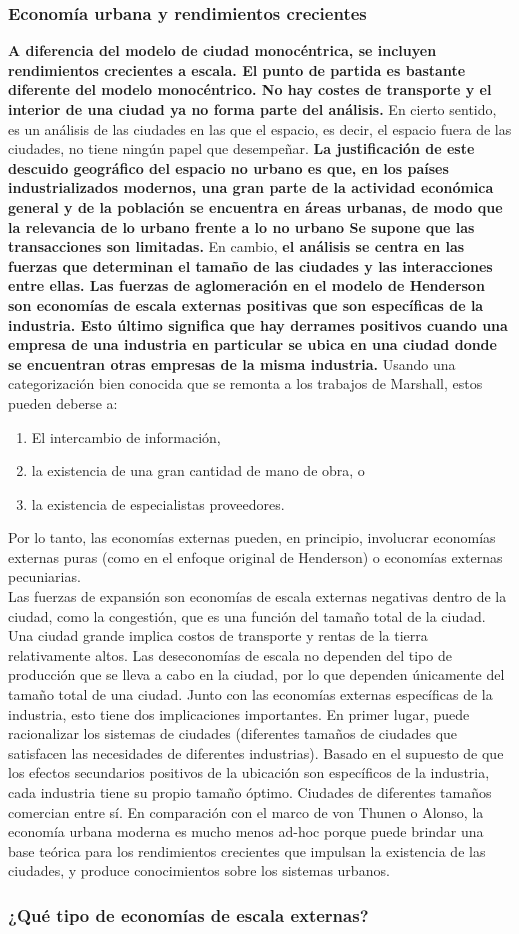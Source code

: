 \subsubsection{Economía urbana y rendimientos crecientes}
\textbf{A diferencia del modelo de ciudad monocéntrica, se incluyen rendimientos crecientes a escala. El punto de partida es bastante diferente del modelo monocéntrico. No hay costes de transporte y el interior de una ciudad ya no forma parte del análisis.} En cierto sentido, es un análisis de las ciudades en las que el espacio, es decir, el espacio fuera de las ciudades, no tiene ningún papel que desempeñar. \textbf{La justificación de este descuido geográfico del espacio no urbano es que, en los países industrializados modernos, una gran parte de la actividad económica general y de la población se encuentra en áreas urbanas, de modo que la relevancia de lo urbano frente a lo no urbano Se supone que las transacciones son limitadas.} En cambio, \textbf{el análisis se centra en las fuerzas que determinan el tamaño de las ciudades y las interacciones entre ellas. Las fuerzas de aglomeración en el modelo de Henderson son economías de escala externas positivas que son específicas de la industria. Esto último significa que hay derrames positivos cuando una empresa de una industria en particular se ubica en una ciudad donde se encuentran otras empresas de la misma industria.} Usando una categorización bien conocida que se remonta a los trabajos de Marshall, estos pueden deberse a:
\begin{enumerate}[\bfseries (i)]
    \item El intercambio de información, 
    \item la existencia de una gran cantidad de mano de obra, o
    \item la existencia de especialistas proveedores.
\end{enumerate}
Por lo tanto, las economías externas pueden, en principio, involucrar economías externas puras (como en el enfoque original de Henderson) o economías externas pecuniarias. \\
Las fuerzas de expansión son economías de escala externas negativas dentro de la ciudad, como la congestión, que es una función del tamaño total de la ciudad. Una ciudad grande implica costos de transporte y rentas de la tierra relativamente altos. Las deseconomías de escala no dependen del tipo de producción que se lleva a cabo en la ciudad, por lo que dependen únicamente del tamaño total de una ciudad. Junto con las economías externas específicas de la industria, esto tiene dos implicaciones importantes. En primer lugar, puede racionalizar los sistemas de ciudades (diferentes tamaños de ciudades que satisfacen las necesidades de diferentes industrias). Basado en el supuesto de que los efectos secundarios positivos de la ubicación son específicos de la industria, cada industria tiene su propio tamaño óptimo. Ciudades de diferentes tamaños comercian entre sí. En comparación con el marco de von Thunen o Alonso, la economía urbana moderna es mucho menos ad-hoc porque puede brindar una base teórica para los rendimientos crecientes que impulsan la existencia de las ciudades, y produce conocimientos sobre los sistemas urbanos. 

\subsubsection{¿Qué tipo de economías de escala externas?}
